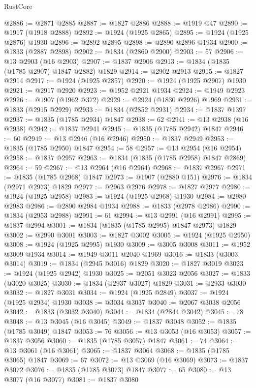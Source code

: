 \begin{lexlean}{RustCore}
\begin{coremodule}
@2886 := @2871 @2885
@2887 := @1827 @2886
@2888 := @1919 @47
@2890 := @1917 (@1918 @2888)
@2892 := @1924 (@1925 @2865)
@2895 := @1924 (@1925 @2876) @1930
@2896 := @2892 @2895
@2898 := @2890 @2896 @1934
@2900 := @1833 (@2887 @2898)
@2902 := @1834 (@2860 @2900)
@2903 := 57
@2906 := @13 @2903 (@16 @2903)
@2907 := @1837 @2906
@2913 := @1834 (@1835 (@1785 @2907) @1847 @2882) @1829
@2914 := @2902 @2913
@2915 := @1827 @2914
@2917 := @1924 (@1925 @2857)
@2920 := @1924 (@1925 @2907) @1930
@2921 := @2917 @2920
@2923 := @1952 @2921 @1934
@2924 := @1949 @2923
@2926 := @1907 (@1962 @372)
@2929 := @2924 (@1830 @2926) @1969
@2931 := @1833 (@2915 @2929)
@2933 := @1834 (@2852 @2931)
@2934 := @1837 @1397
@2937 := @1835 (@1785 @2934) @1847
@2938 := 62
@2941 := @13 @2938 (@16 @2938)
@2942 := @1837 @2941
@2945 := @1835 (@1785 @2942) @1847
@2946 := 60
@2949 := @13 @2946 (@16 @2946)
@2950 := @1837 @2949
@2953 := @1835 (@1785 @2950) @1847
@2954 := 58
@2957 := @13 @2954 (@16 @2954)
@2958 := @1837 @2957
@2963 := @1834 (@1835 (@1785 @2958) @1847 @2869)
@2964 := 59
@2967 := @13 @2964 (@16 @2964)
@2968 := @1837 @2967
@2971 := @1835 (@1785 @2968) @1847
@2973 := @1907 (@2880 @151)
@2976 := @1834 (@2971 @2973) @1829
@2977 := @2963 @2976
@2978 := @1827 @2977
@2980 := @1924 (@1925 @2958)
@2983 := @1924 (@1925 @2968) @1930
@2984 := @2980 @2983
@2986 := @2890 @2984 @1934
@2988 := @1833 (@2978 @2986)
@2990 := @1834 (@2953 @2988)
@2991 := 61
@2994 := @13 @2991 (@16 @2991)
@2995 := @1837 @2994
@3001 := @1834 (@1835 (@1785 @2995) @1847 @2973) @1829
@3002 := @2990 @3001
@3003 := @1827 @3002
@3005 := @1924 (@1925 @2950)
@3008 := @1924 (@1925 @2995) @1930
@3009 := @3005 @3008
@3011 := @1952 @3009 @1934
@3014 := @1949 @3011 @2040 @1969
@3016 := @1833 (@3003 @3014)
@3019 := @1834 (@2945 @3016) @1829
@3020 := @1827 @3019
@3023 := @1924 (@1925 @2942) @1930
@3025 := @2051 @3023 @2056
@3027 := @1833 (@3020 @3025)
@3030 := @1834 (@2937 @3027) @1829
@3031 := @2933 @3030
@3032 := @1827 @3031
@3034 := @1924 (@1925 @2849)
@3037 := @1924 (@1925 @2934) @1930
@3038 := @3034 @3037
@3040 := @2067 @3038 @2056
@3042 := @1833 (@3032 @3040)
@3044 := @1834 (@2844 @3042)
@3045 := 78
@3048 := @13 @3045 (@16 @3045)
@3049 := @1837 @3048
@3052 := @1835 (@1785 @3049) @1847
@3053 := 76
@3056 := @13 @3053 (@16 @3053)
@3057 := @1837 @3056
@3060 := @1835 (@1785 @3057) @1847
@3061 := 74
@3064 := @13 @3061 (@16 @3061)
@3065 := @1837 @3064
@3068 := @1835 (@1785 @3065) @1847
@3069 := 67
@3072 := @13 @3069 (@16 @3069)
@3073 := @1837 @3072
@3076 := @1835 (@1785 @3073) @1847
@3077 := 65
@3080 := @13 @3077 (@16 @3077)
@3081 := @1837 @3080

\end{coremodule}
\end{lexlean}
